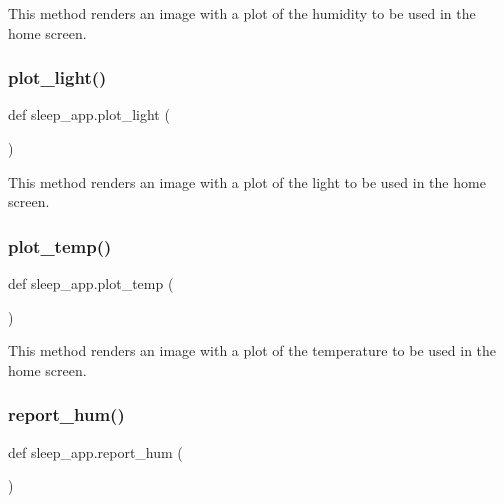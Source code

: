 This method renders an image with a plot of the humidity to be used in the home screen. 

\mbox{\label{namespacesleep__app_acffc6c22f7ca7893205010154c31cc88}} 
\subsubsection{\texorpdfstring{plot\+\_\+light()}{plot\_light()}}
{\footnotesize\ttfamily def sleep\+\_\+app.\+plot\+\_\+light (\begin{DoxyParamCaption}{ }\end{DoxyParamCaption})}



This method renders an image with a plot of the light to be used in the home screen. 

\mbox{\label{namespacesleep__app_a2bde4dd5ac826c71f2bc1943415cb2e3}} 
\subsubsection{\texorpdfstring{plot\+\_\+temp()}{plot\_temp()}}
{\footnotesize\ttfamily def sleep\+\_\+app.\+plot\+\_\+temp (\begin{DoxyParamCaption}{ }\end{DoxyParamCaption})}



This method renders an image with a plot of the temperature to be used in the home screen. 

\mbox{\label{namespacesleep__app_a18ff8b53c78d6e72682a2b1c19e73aa2}} 
\subsubsection{\texorpdfstring{report\+\_\+hum()}{report\_hum()}}
{\footnotesize\ttfamily def sleep\+\_\+app.\+report\+\_\+hum (\begin{DoxyParamCaption}{ }\end{DoxyParamCaption})}



